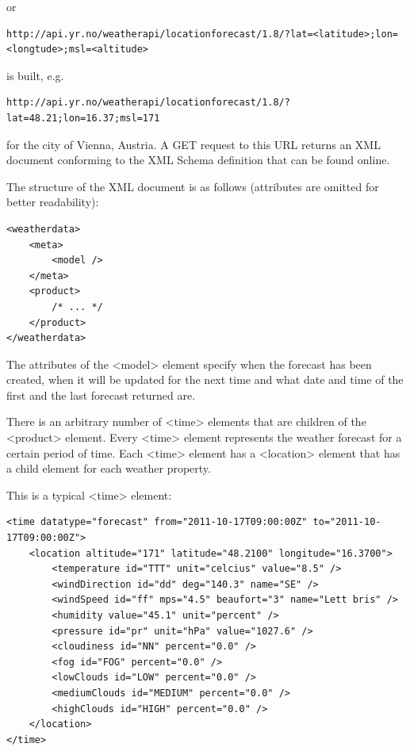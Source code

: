 or

\begin{lstlisting}
http://api.yr.no/weatherapi/locationforecast/1.8/?lat=<latitude>;lon=<longtude>;msl=<altitude>
\end{lstlisting}

is built, e.g.

\begin{lstlisting}
http://api.yr.no/weatherapi/locationforecast/1.8/?lat=48.21;lon=16.37;msl=171
\end{lstlisting}

for the city of Vienna, Austria. A GET request to this URL returns an XML document conforming to the XML Schema definition that can be found
online.

The structure of the XML document is as follows (attributes are omitted for better readability):

\begin{lstlisting}
<weatherdata>
	<meta>
		<model />
	</meta>
	<product>
		/* ... */
	</product>
</weatherdata>
\end{lstlisting}

The attributes of the <model> element specify when the forecast has been created, when it will be updated for the next time and what date and time of the first and the last forecast returned are.

There is an arbitrary number of <time> elements that are children of the <product> element. Every <time> element represents the weather forecast for a certain period of time. Each <time> element has a <location> element that has a child element for each weather property.

This is a typical <time> element:

\begin{lstlisting}
<time datatype="forecast" from="2011-10-17T09:00:00Z" to="2011-10-17T09:00:00Z">
	<location altitude="171" latitude="48.2100" longitude="16.3700">
		<temperature id="TTT" unit="celcius" value="8.5" />
		<windDirection id="dd" deg="140.3" name="SE" />
		<windSpeed id="ff" mps="4.5" beaufort="3" name="Lett bris" />
		<humidity value="45.1" unit="percent" />
		<pressure id="pr" unit="hPa" value="1027.6" />
		<cloudiness id="NN" percent="0.0" />
		<fog id="FOG" percent="0.0" />
		<lowClouds id="LOW" percent="0.0" />
		<mediumClouds id="MEDIUM" percent="0.0" />
		<highClouds id="HIGH" percent="0.0" />
	</location>
</time>
\end{lstlisting}

